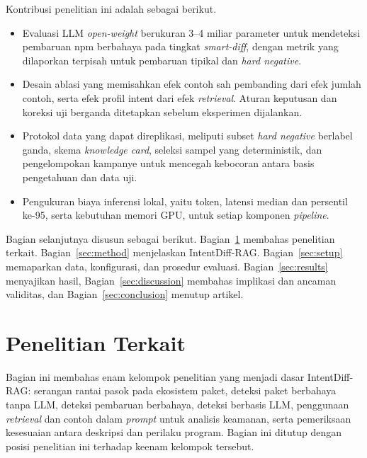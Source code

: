 \documentclass[a4paper,fleqn]{cas-dc}
\begin{document}
Kontribusi penelitian ini adalah sebagai berikut.

\begin{itemize}
\item Evaluasi LLM \emph{open-weight} berukuran 3--4 miliar parameter untuk
mendeteksi pembaruan npm berbahaya pada tingkat \emph{smart-diff}, dengan metrik
yang dilaporkan terpisah untuk pembaruan tipikal dan \emph{hard negative}.
\item Desain ablasi yang memisahkan efek contoh sah pembanding dari efek jumlah
contoh, serta efek profil intent dari efek \emph{retrieval}. Aturan keputusan
dan koreksi uji berganda ditetapkan sebelum eksperimen dijalankan.
\item Protokol data yang dapat direplikasi, meliputi subset \emph{hard negative}
berlabel ganda, skema \emph{knowledge card}, seleksi sampel yang deterministik,
dan pengelompokan kampanye untuk mencegah kebocoran antara basis pengetahuan dan
data uji.
\item Pengukuran biaya inferensi lokal, yaitu token, latensi median dan persentil
ke-95, serta kebutuhan memori GPU, untuk setiap komponen \emph{pipeline}.
\end{itemize}


Bagian selanjutnya disusun sebagai berikut. Bagian~\ref{sec:related} membahas
penelitian terkait. Bagian~\ref{sec:method} menjelaskan IntentDiff-RAG.
Bagian~\ref{sec:setup} memaparkan data, konfigurasi, dan prosedur evaluasi.
Bagian~\ref{sec:results} menyajikan hasil, Bagian~\ref{sec:discussion} membahas
implikasi dan ancaman validitas, dan Bagian~\ref{sec:conclusion} menutup artikel.

\section{Penelitian Terkait}\label{sec:related}


Bagian ini membahas enam kelompok penelitian yang menjadi dasar IntentDiff-RAG:
serangan rantai pasok pada ekosistem paket, deteksi paket berbahaya tanpa LLM,
deteksi pembaruan berbahaya, deteksi berbasis LLM, penggunaan \emph{retrieval}
dan contoh dalam \emph{prompt} untuk analisis keamanan, serta pemeriksaan
kesesuaian antara deskripsi dan perilaku program. Bagian ini ditutup dengan
posisi penelitian ini terhadap keenam kelompok tersebut.
\end{document}
